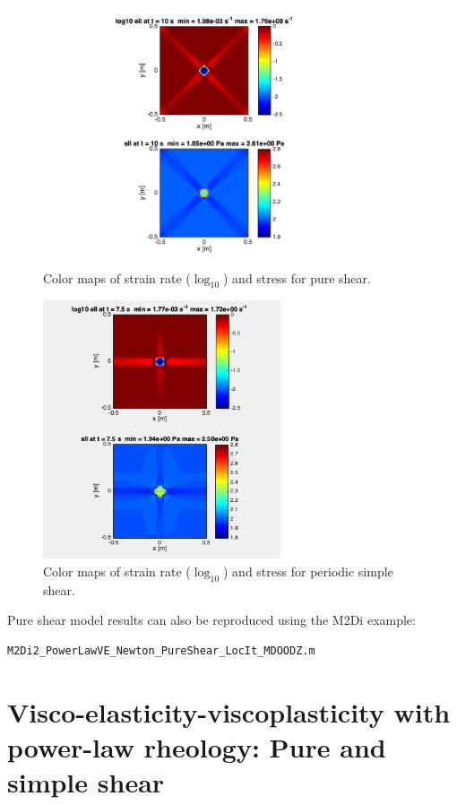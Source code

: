 \documentclass[12pt,english,openany]{scrbook}
\begin{document}
\begin{figure}[ht!]
\centerline{\includegraphics[height=3.0in]{./Figures/PureShear_pwl_VE_cmaps}}
\caption{Color maps of strain rate ($\log_{10}$) and stress for pure shear.}
\label{PureShear_pwl_VE_cmaps}
\end{figure}

\begin{figure}[ht!]
\centerline{\includegraphics[height=3.0in]{./Figures/SimpleShear_pwl_VE_cmaps}}
\caption{Color maps of strain rate ($\log_{10}$) and stress for periodic simple shear.}
\label{PureShear_pwl_VE_cmaps}
\end{figure}

Pure shear model results can also be reproduced using the M2Di example:
\begin{verbatim} 
M2Di2_PowerLawVE_Newton_PureShear_LocIt_MDOODZ.m
\end{verbatim}

\section{Visco-elasticity-viscoplasticity with power-law rheology: Pure and simple shear}
\end{document}
